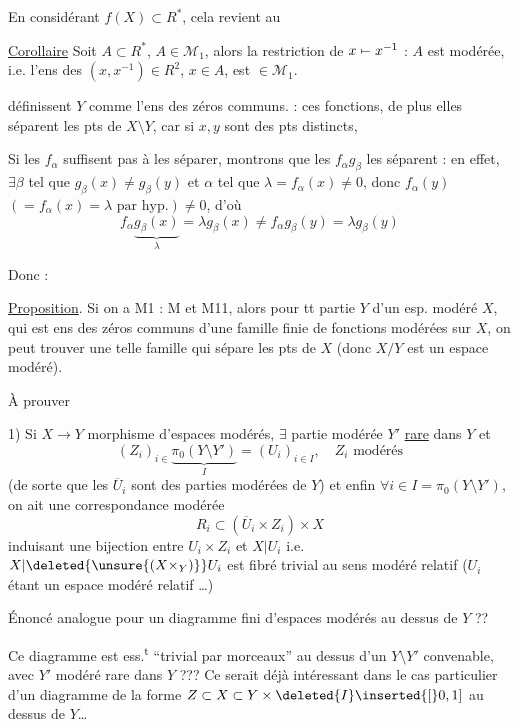 En considérant $f(X)\subset R^*$, cela revient au

\uline{Corollaire} Soit $A\subset R^*$, $A\in\mathcal M_1$, alors la restriction de $x\mathrel{\mapstochar\relbar}x^{-1}$ : $A$ est modérée, i.e. l'ens des $(x,x^{-1})\in R^2$, $x\in A$, est $\in\mathcal M_1$.


définissent $Y$ comme l'ens des zéros communs.  : ces fonctions, de plus elles séparent les pts de $X\setminus Y$, car si $x,y$ sont des pts distincts, 

Si les $f_\alpha$  suffisent pas à les séparer, montrons que les $f_\alpha g_\beta$ les séparent : en effet, $\exists\beta$ tel que $g_\beta(x)\ne g_\beta(y)$  et $\alpha$ tel que $\lambda=f_\alpha(x)\ne0$, donc $f_\alpha(y)$ $(=f_\alpha(x)=\lambda\text{ par hyp.})\ne0$, d'où
\[
f_\alpha\underbrace{g_\beta(x)}_{\lambda}=\lambda g_\beta(x)\ne f_\alpha g_\beta(y)=\lambda g_\beta(y)
\]

Donc :

\uline{Proposition}. Si on a M1 : M et M11, alors pour tt partie   $Y$ d'un esp. modéré $X$, qui est ens des zéros communs d'une famille finie de fonctions modérées sur $X$, on peut trouver une telle famille qui sépare les pts de $X$ (donc $X/Y$ est un espace modéré).


À prouver

1) Si $X\to Y$ morphisme d'espaces modérés, $\exists$ partie modérée $Y'$ \uline{rare} dans $Y$ et
\[
(Z_i)_{i\in}\underbrace{\pi_0(Y\setminus Y')}_{I}=(U_i)_{i\in I},\quad Z_i\text{ modérés}
\]
(de sorte que les $\overline U_i$ sont des parties modérées de $Y$) et enfin $\forall i\in I=\pi_0(Y\setminus Y')$, on ait une correspondance modérée
\[
R_i\subset(\overline U_i\times Z_i)\times X
\]
induisant une bijection entre $U_i\times Z_i$ et $X|U_i$ i.e. $X|\deleted{\unsure{(X\times_Y)}}U_i$ est fibré  trivial au sens modéré relatif ($U_i$ étant un espace modéré relatif \ldots)

Énoncé analogue pour un diagramme fini d'espaces modérés au dessus de $Y$ ??

Ce diagramme est ess.\textsuperscript{t} ``trivial par morceaux'' au dessus d'un $Y\setminus Y'$ convenable, avec $Y'$ modéré rare dans $Y$ ??? Ce serait déjà intéressant dans le cas particulier d'un diagramme de la forme $Z\subset X\subset Y\times\deleted{I}\inserted{[}0,1]$ \deleted{$\unsure{(I\subset[0,}$} au dessus de $Y$\ldots

